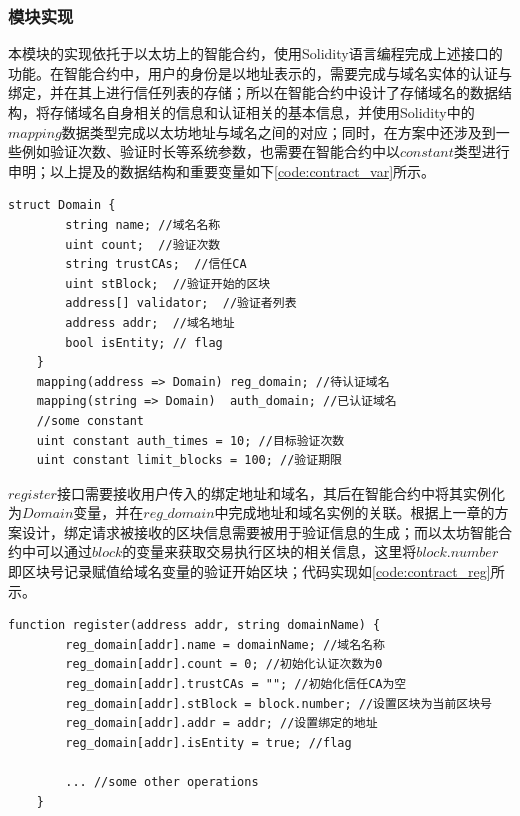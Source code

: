 

\subsubsection{模块实现}

本模块的实现依托于以太坊上的智能合约，使用Solidity语言编程完成上述接口的功能。在智能合约中，用户的身份是以地址表示的，需要完成与域名实体的认证与绑定，并在其上进行信任列表的存储；所以在智能合约中设计了存储域名的数据结构，将存储域名自身相关的信息和认证相关的基本信息，并使用Solidity中的$mapping$数据类型完成以太坊地址与域名之间的对应；同时，在方案中还涉及到一些例如验证次数、验证时长等系统参数，也需要在智能合约中以$constant$类型进行申明；以上提及的数据结构和重要变量如下\ref{code:contract_var}所示。

\begin{lstlisting}[caption={域名数据结构和重要变量}, label={code:contract_var}]
    struct Domain {
        string name; //域名名称
        uint count;  //验证次数
        string trustCAs;  //信任CA
        uint stBlock;  //验证开始的区块
        address[] validator;  //验证者列表
        address addr;  //域名地址
        bool isEntity; // flag 
    }
    mapping(address => Domain) reg_domain; //待认证域名
    mapping(string => Domain)  auth_domain; //已认证域名
    //some constant
    uint constant auth_times = 10; //目标验证次数
    uint constant limit_blocks = 100; //验证期限
\end{lstlisting}

$register$接口需要接收用户传入的绑定地址和域名，其后在智能合约中将其实例化为$Domain$变量，并在$reg\_domain$中完成地址和域名实例的关联。根据上一章的方案设计，绑定请求被接收的区块信息需要被用于验证信息的生成；而以太坊智能合约中可以通过$block$的变量来获取交易执行区块的相关信息，这里将$block.number$即区块号记录赋值给域名变量的验证开始区块；代码实现如\ref{code:contract_reg}所示。

\begin{lstlisting}[caption={register接口部分实现}, label={code:contract_reg}]
    function register(address addr, string domainName) { 
        reg_domain[addr].name = domainName; //域名名称
        reg_domain[addr].count = 0; //初始化认证次数为0
        reg_domain[addr].trustCAs = ""; //初始化信任CA为空
        reg_domain[addr].stBlock = block.number; //设置区块为当前区块号
        reg_domain[addr].addr = addr; //设置绑定的地址
        reg_domain[addr].isEntity = true; //flag
        
        ... //some other operations
    }
\end{lstlisting}

